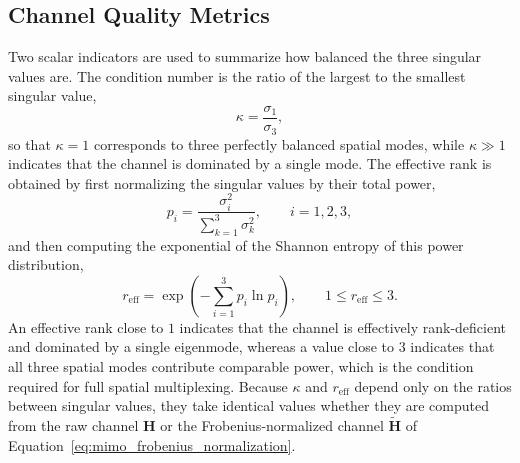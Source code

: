 \subsection{Channel Quality Metrics}
Two scalar indicators are used to summarize how balanced the three singular values are. The condition number is the ratio of the largest to the smallest singular value,
\begin{equation}
    \kappa = \frac{\sigma_1}{\sigma_3},
    \label{eq:mimo_condition_number}
\end{equation}
so that $\kappa=1$ corresponds to three perfectly balanced spatial modes, while $\kappa\gg1$ indicates that the channel is dominated by a single mode. The effective rank is obtained by first normalizing the singular values by their total power,
\begin{equation}
    p_i = \frac{\sigma_i^{2}}{\sum_{k=1}^{3}\sigma_k^{2}},
    \qquad i=1,2,3,
    \label{eq:mimo_power_fraction}
\end{equation}
and then computing the exponential of the Shannon entropy of this power distribution,
\begin{equation}
    r_{\mathrm{eff}} = \exp\!\left(-\sum_{i=1}^{3}p_i\ln p_i\right),
    \qquad 1\leq r_{\mathrm{eff}}\leq3.
    \label{eq:mimo_effective_rank}
\end{equation}
An effective rank close to $1$ indicates that the channel is effectively rank-deficient and dominated by a single eigenmode, whereas a value close to $3$ indicates that all three spatial modes contribute comparable power, which is the condition required for full spatial multiplexing. Because $\kappa$ and $r_{\mathrm{eff}}$ depend only on the ratios between singular values, they take identical values whether they are computed from the raw channel $\mathbf{H}$ or the Frobenius-normalized channel $\widetilde{\mathbf{H}}$ of Equation~\ref{eq:mimo_frobenius_normalization}.

